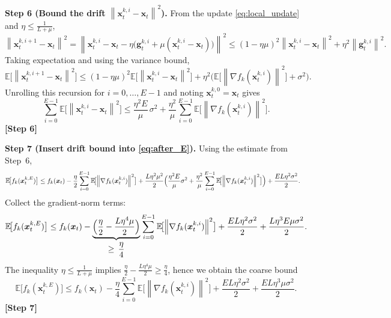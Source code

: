 \documentclass{article}
\newcommand{\E}{\mathbb{E}}
\newcommand{\norm}[1]{\left\lVert #1\right\rVert}
\begin{document}
\noindent\textbf{Step 6 (Bound the drift $\norm{\bm{x}_{t}^{k,i}-\bm{x}_t}^{2}$).}
From the update \eqref{eq:local_update} and $\eta\le\frac{1}{L+\mu}$,
\[
\norm{\bm{x}_{t}^{k,i+1}-\bm{x}_t}^{2}
   =\norm{\bm{x}_{t}^{k,i}-\bm{x}_t
        -\eta\bigl(\bm{g}_{t}^{k,i}+\mu(\bm{x}_{t}^{k,i}-\bm{x}_t)\bigr)}^{2}
   \le (1-\eta\mu)^{2}\norm{\bm{x}_{t}^{k,i}-\bm{x}_t}^{2}
        +\eta^{2}\norm{\bm{g}_{t}^{k,i}}^{2}.
\]
Taking expectation and using the variance bound,
\[
\E\!\bigl[\norm{\bm{x}_{t}^{k,i+1}-\bm{x}_t}^{2}\bigr]
   \le (1-\eta\mu)^{2}\E\!\bigl[\norm{\bm{x}_{t}^{k,i}-\bm{x}_t}^{2}\bigr]
        +\eta^{2}\bigl(\E\!\bigl[\norm{\nabla f_k(\bm{x}_{t}^{k,i})}^{2}\bigr]+\sigma^{2}\bigr).
\]
Unrolling this recursion for $i=0,\dots,E-1$ and noting $\bm{x}_{t}^{k,0}=\bm{x}_t$ gives
\[
\sum_{i=0}^{E-1}\E\!\bigl[\norm{\bm{x}_{t}^{k,i}-\bm{x}_t}^{2}\bigr]
   \le \frac{\eta^{2}E}{\mu}\,\sigma^{2}
      +\frac{\eta^{2}}{\mu}\sum_{i=0}^{E-1}\E\!\bigl[\norm{\nabla f_k(\bm{x}_{t}^{k,i})}^{2}\bigr] .
\]
\textbf{[Step 6]}

\noindent\textbf{Step 7 (Insert drift bound into \eqref{eq:after_E}).}
Using the estimate from Step~6,
\begin{align}
\E\!\bigl[f_k(\bm{x}_{t}^{k,E})\bigr]
&\le f_k(\bm{x}_t)
   -\frac{\eta}{2}\sum_{i=0}^{E-1}\E\!\bigl[\norm{\nabla f_k(\bm{x}_{t}^{k,i})}^{2}\bigr]
   +\frac{L\eta^{2}\mu^{2}}{2}\Bigl(\frac{\eta^{2}E}{\mu}\sigma^{2}
          +\frac{\eta^{2}}{\mu}\sum_{i=0}^{E-1}\E\!\bigl[\norm{\nabla f_k(\bm{x}_{t}^{k,i})}^{2}\bigr]\Bigr)
   +\frac{E L\eta^{2}\sigma^{2}}{2} .
\end{align}
Collect the gradient‑norm terms:
\[
\E\!\bigl[f_k(\bm{x}_{t}^{k,E})\bigr]
\le f_k(\bm{x}_t)
   -\underbrace{\Bigl(\frac{\eta}{2}
        -\frac{L\eta^{4}\mu}{2}\Bigr)}_{\displaystyle\ge\,\frac{\eta}{4}}
        \sum_{i=0}^{E-1}\E\!\bigl[\norm{\nabla f_k(\bm{x}_{t}^{k,i})}^{2}\bigr]
   +\frac{E L\eta^{2}\sigma^{2}}{2}
   +\frac{L\eta^{3}E\mu\sigma^{2}}{2}.
\]
The inequality $\eta\le\frac{1}{L+\mu}$ implies $\frac{\eta}{2}-\frac{L\eta^{4}\mu}{2}\ge\frac{\eta}{4}$,
hence we obtain the coarse bound
\begin{equation}
\E\!\bigl[f_k(\bm{x}_{t}^{k,E})\bigr]
\le f_k(\bm{x}_t)
   -\frac{\eta}{4}\sum_{i=0}^{E-1}\E\!\bigl[\norm{\nabla f_k(\bm{x}_{t}^{k,i})}^{2}\bigr]
   +\frac{E L\eta^{2}\sigma^{2}}{2}
   +\frac{E L\eta^{3}\mu\sigma^{2}}{2}.
\label{eq:client_bound}
\end{equation}
\textbf{[Step 7]}
\end{document}
